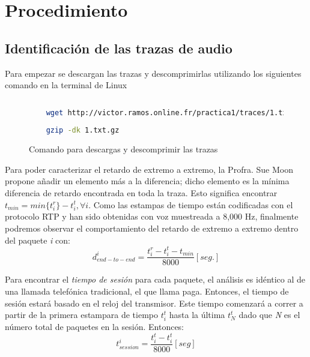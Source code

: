 \section*{Procedimiento}

\subsection*{Identificaci\'on de las trazas de audio}
\noindent Para empezar se descargan las trazas y descomprimirlas utilizando los siguientes comando en la terminal de Linux
\begin{figure}[H]
  \centering
  \begin{lstlisting}[frame=single, breaklines=true, basicstyle=\footnotesize\ttfamily, breakatwhitespace=false, 
      columns=flexible, tabsize=2, showstringspaces=false, language=bash] 
    
    wget http://victor.ramos.online.fr/practica1/traces/1.txt.gz
    
    gzip -dk 1.txt.gz

  \end{lstlisting}
  \caption{Comando para descargas y descomprimir las trazas}
  \label{fig:commandDownloadExtract}
\end{figure}

\noindent Para poder caracterizar el retardo de extremo a extremo, la Profra. Sue Moon propone añadir un elemento más a la
diferencia; dicho elemento es la mínima diferencia de retardo encontrada en toda la traza. Esto significa encontrar
\( t_{min}=min\{ t^r_i\}-t^t_i, \forall i\). Como las estampas de tiempo est\'an codificadas con el protocolo RTP y han sido
obtenidas con voz muestreada a 8,000 Hz, finalmente podremos observar el comportamiento del retardo de extremo a extremo
dentro del paquete \textit{i} con:
\begin{equation}
  d^i_{end-to-end}=\frac{t^r_i-t^t_i-t_{min}}{8000}[seg.]
\end{equation}

\noindent Para encontrar el \textit{tiempo de sesi\'on} para cada paquete, el an\'alisis es id\'entico al de una llamada
telef\'onica tradicional, el que llama paga. Entonces, el tiempo de sesi\'on estar\'a basado en el reloj del transmisor. Este
tiempo comenzar\'a a correr a partir de la primera estampara de tiempo \( t^t_i \) hasta la \'ultima \( t^t_N \) dado que
\textit{N} es el n\'umero total de paquetes en la sesi\'on. Entonces:
\begin{equation}
  t^i_{session}=\frac{t^t_i-t^t_i}{8000}[seg]
\end{equation}

